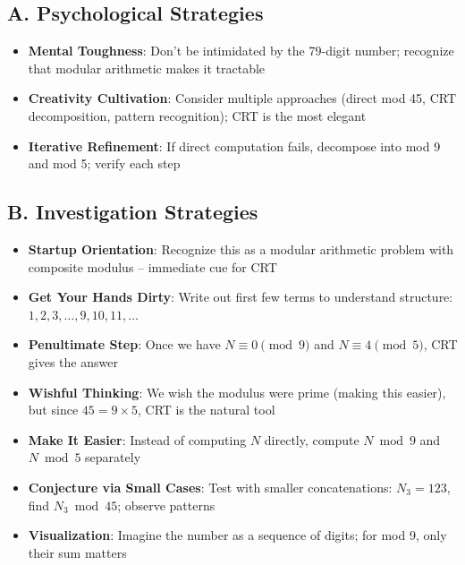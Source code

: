 \documentclass[11pt]{article}
\begin{document}
\begin{strategicbox}
\subsection*{A. Psychological Strategies}
\begin{itemize}[leftmargin=*]
    \item \textbf{Mental Toughness}: Don't be intimidated by the 79-digit number; recognize that modular arithmetic makes it tractable
    
    \item \textbf{Creativity Cultivation}: Consider multiple approaches (direct mod 45, CRT decomposition, pattern recognition); CRT is the most elegant
    
    \item \textbf{Iterative Refinement}: If direct computation fails, decompose into mod 9 and mod 5; verify each step
\end{itemize}

\subsection*{B. Investigation Strategies}
\begin{itemize}[leftmargin=*]
    \item \textbf{Startup Orientation}: Recognize this as a modular arithmetic problem with composite modulus -- immediate cue for CRT
    
    \item \textbf{Get Your Hands Dirty}: Write out first few terms to understand structure: $1,2,3,\ldots,9,10,11,\ldots$
    
    \item \textbf{Penultimate Step}: Once we have $N \equiv 0 \pmod{9}$ and $N \equiv 4 \pmod{5}$, CRT gives the answer
    
    \item \textbf{Wishful Thinking}: We wish the modulus were prime (making this easier), but since $45 = 9 \times 5$, CRT is the natural tool
    
    \item \textbf{Make It Easier}: Instead of computing $N$ directly, compute $N \bmod 9$ and $N \bmod 5$ separately
    
    \item \textbf{Conjecture via Small Cases}: Test with smaller concatenations: $N_3 = 123$, find $N_3 \bmod 45$; observe patterns
    
    \item \textbf{Visualization}: Imagine the number as a sequence of digits; for mod 9, only their sum matters
\end{itemize}


\end{strategicbox}
\end{document}
